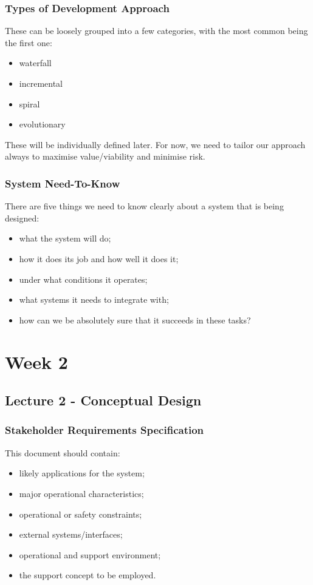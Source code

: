 \documentclass[journal]{IEEEtran}
\begin{document}
\subsubsection{Types of Development Approach}
These can be loosely grouped into a few categories, with the most common being the first one:
\begin{itemize}
	\item waterfall
	\item incremental
	\item spiral
	\item evolutionary
\end{itemize}
These will be individually defined later. For now, we need to tailor our approach always to maximise value/viability and minimise risk.
\subsubsection{System Need-To-Know}
There are five things we need to know clearly about a system that is being designed:
\begin{itemize}
	\item what the system will do;
	\item how it does its job and how well it does it;
	\item under what conditions it operates;
	\item what systems it needs to integrate with;
	\item how can we be absolutely sure that it succeeds in these tasks?
\end{itemize}

\section{Week 2}
\subsection{\textbf{Lecture 2 - Conceptual Design}}
\subsubsection{Stakeholder Requirements Specification}
This document should contain:
\begin{itemize}
	\item likely applications for the system;
	\item major operational characteristics;
	\item operational or safety constraints;
	\item external systems/interfaces;
	\item operational and support environment;
	\item the support concept to be employed.
\end{itemize}
\end{document}
